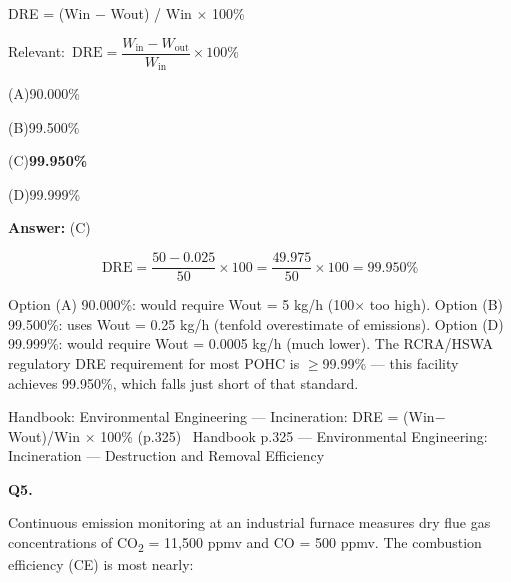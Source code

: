 \documentclass[11pt]{article}
\newcommand{\correct}[1]{\textbf{#1}\;{\color{accent}$\checkmark$}}
\newcommand{\optline}[2]{\par\noindent\hspace{1.2em}(#1)\hspace{0.6em}#2}
\begin{document}
DRE = (Win $-$ Wout) / Win $\times$ 100\%\par\vspace{3pt}
{\small\color{soft}Relevant:}\ $\text{DRE} = \dfrac{W_{\text{in}} - W_{\text{out}}}{W_{\text{in}}} \times 100\%$\par\vspace{3pt}
\optline{A}{90.000\%}
\optline{B}{99.500\%}
\optline{C}{\correct{99.950\%}}
\optline{D}{99.999\%}
\par\vspace{3pt}
\vspace{2pt}\par\noindent\colorbox{boxbg}{\parbox{\dimexpr\linewidth-2\fboxsep\relax}{%
\vspace{2pt}\textbf{Answer:} (C)\par\vspace{2pt}
{\small \[\text{DRE} = \frac{50 - 0.025}{50} \times 100 = \frac{49.975}{50} \times 100 = 99.950\%\]

Option (A) 90.000\%: would require Wout = 5 kg/h (100$\times$ too high). Option (B) 99.500\%: uses Wout = 0.25 kg/h (tenfold overestimate of emissions). Option (D) 99.999\%: would require Wout = 0.0005 kg/h (much lower). The RCRA/HSWA regulatory DRE requirement for most POHC is $\ge$99.99\% --- this facility achieves 99.950\%, which falls just short of that standard.}\par\vspace{2pt}
{\footnotesize\color{soft}Handbook: Environmental Engineering --- Incineration: DRE = (Win$-$Wout)/Win $\times$ 100\% (p.325) \textbullet\ Handbook p.325 --- Environmental Engineering: Incineration --- Destruction and Removal Efficiency}\vspace{2pt}
}}
\vspace{9pt}
\filbreak
\textbf{\color{accent}Q5.}\par\vspace{2pt}
Continuous emission monitoring at an industrial furnace measures dry flue gas concentrations of CO\textsubscript{2} = 11,500 ppmv and CO = 500 ppmv. The combustion efficiency (CE) is most nearly:
\end{document}
